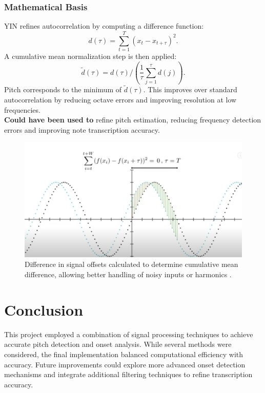 \documentclass{article}
\begin{document}
\subsubsection{Mathematical Basis}
YIN refines autocorrelation by computing a difference function:
\begin{equation}
d(\tau) = \sum_{t=1}^{T} (x_t - x_{t+\tau})^2.
\end{equation}
A cumulative mean normalization step is then applied:
\begin{equation}
\tilde{d}(\tau) = d(\tau) / \left(\frac{1}{\tau} \sum_{j=1}^{\tau} d(j) \right).
\end{equation}
Pitch corresponds to the minimum of $\tilde{d}(\tau)$. This improves over standard autocorrelation by reducing octave errors and improving resolution at low frequencies. \\

\textbf{Could have been used to} refine pitch estimation, reducing frequency detection errors and improving note transcription accuracy.

\begin{figure}[H]
\includegraphics[width=\textwidth,scale=0.5]{images/yin-function.png}
\caption{Difference in signal offsets calculated to determine cumulative mean difference, allowing better handling of noisy inputs or harmonics \cite{YIN-intuition}.}
\end{figure}

\newpage

\section{Conclusion}
This project employed a combination of signal processing techniques to achieve accurate pitch detection and onset analysis. While several methods were considered, the final implementation balanced computational efficiency with accuracy. Future improvements could explore more advanced onset detection mechanisms and integrate additional filtering techniques to refine transcription accuracy.

\newpage


\end{document}
